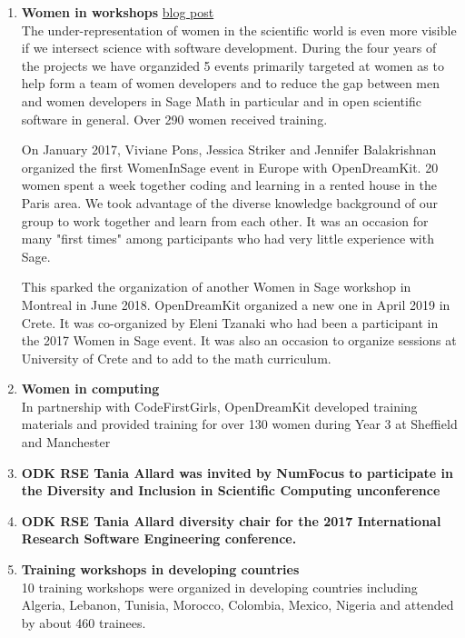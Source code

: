 \begin{enumerate}
\item \textbf{Women in \Sage workshops} \href{https://opendreamkit.org/2017/04/06/WomenInSage/}{blog post}\\
  The under-representation of women in the scientific world is even
  more visible if we intersect science with software development. During the four years of the projects we have organzided 5 events primarily targeted at women as to help form a team of women developers and to reduce the gap between men and women developers in Sage Math in particular and in open scientific software in general. Over 290 women received training.

  On January 2017, Viviane Pons, Jessica Striker and Jennifer
  Balakrishnan organized the first WomenInSage event in Europe with
  OpenDreamKit. 20 women spent a week together coding and learning in
  a rented house in the Paris area. We took advantage of the diverse
  knowledge background of our group to work together and learn from
  each other. It was an occasion for many "first times" among
  participants who had very little experience with Sage.

  This sparked the organization of another Women in Sage workshop in
  Montreal in June 2018. OpenDreamKit organized a new one in April 2019
  in Crete. It was co-organized by Eleni Tzanaki who had been a participant in the 
  2017 Women in Sage event. It was also an occasion to organize \Sage sessions
  at University of Crete and to add \Sage to the math curriculum.

\item \textbf{Women in computing}\\
  In partnership with CodeFirstGirls, OpenDreamKit developed training
  materials and provided training for over 130 women during Year 3 at Sheffield and Manchester

\item \textbf{ODK RSE Tania Allard was invited by NumFocus to
    participate in the Diversity and Inclusion in Scientific Computing
    unconference}

\item \textbf{ODK RSE Tania Allard diversity chair for the 2017
    International Research Software Engineering conference.}

\item \textbf{Training workshops in developing countries }\\
  10 training workshops were organized in developing countries
  including Algeria, Lebanon, Tunisia, Morocco, Colombia, Mexico, Nigeria and
  attended by about 460 trainees.\\
  

\end{enumerate}

